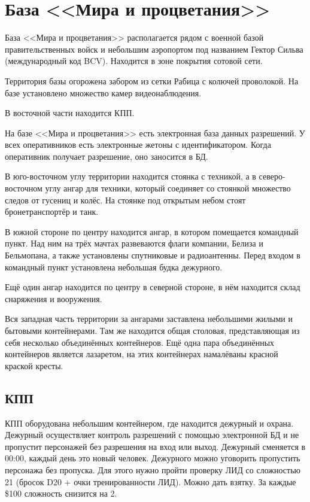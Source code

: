 \documentclass{article}
\begin{document}
\section{База <<Мира и
процветания>>}\label{pap-base}

База <<Мира и процветания>> располагается рядом с военной базой
правительственных войск и небольшим аэропортом под названием Гектор
Сильва (международный код BCV). Находится в зоне покрытия сотовой сети.

Территория базы огорожена забором из сетки Рабица с колючей проволокой.
На базе установлено множество камер видеонаблюдения.

В восточной части находится КПП.

На базе <<Мира и процветания>> есть электронная база данных разрешений. У
всех оперативников есть электронные жетоны с идентификатором. Когда
оперативник получает разрешение, оно заносится в БД.

В юго-восточном углу территории находится стоянка с техникой, а в
северо-восточном углу ангар для техники, который соединяет со стоянкой
множество следов от гусениц и колёс. На стоянке под открытым небом стоят
бронетранспортёр и танк.

В южной стороне по центру находится ангар, в котором помещается
командный пункт. Над ним на трёх мачтах развеваются флаги компании,
Белиза и Бельмопана, а также установлены спутниковые и радиоантенны.
Перед входом в командный пункт установлена небольшая будка дежурного.

Ещё один ангар находится по центру в северной стороне, в нём находится
склад снаряжения и вооружения.

Вся западная часть территории за ангарами заставлена небольшими жилыми и
бытовыми контейнерами. Там же находится общая столовая, представляющая
из себя несколько объединённых контейнеров. Ещё одна пара объединённых
контейнеров является лазаретом, на этих контейнерах намалёваны красной
краской кресты.

\subsection{КПП}\label{checkpoint}

КПП оборудована небольшим контейнером, где находится дежурный и охрана.
Дежурный осуществляет контроль разрешений с помощью электронной БД и не
пропустит персонажей без разрешения на вход или выход. Дежурный
сменяется в 00:00, каждый день это новый человек. Дежурного можно
уговорить пропустить персонажа без пропуска. Для этого нужно пройти
проверку ЛИД со сложностью 21 (бросок D20 + очки тренированности ЛИД).
Можно дать взятку. За каждые \$100 сложность снизится на 2.
\end{document}
